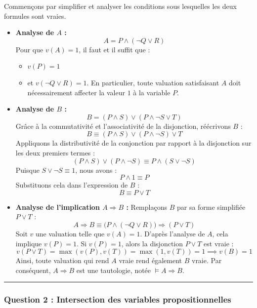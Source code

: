 \documentclass[11pt,a4paper]{article}
\begin{document}
Commençons par simplifier et analyser les conditions sous lesquelles les
deux formules sont vraies.

\begin{itemize}
\item
  \textbf{Analyse de \(A\) :} \[A = P \land (\neg Q \lor R)\] Pour que
  \(v(A) = 1\), il faut et il suffit que :

  \begin{itemize}
  \tightlist
  \item
    \(v(P) = 1\)
  \item
    et \(v(\neg Q \lor R) = 1\). En particulier, toute valuation
    satisfaisant \(A\) doit nécessairement affecter la valeur \(1\) à la
    variable \(P\).
  \end{itemize}
\item
  \textbf{Analyse de \(B\) :}
  \[B = (P \land S) \lor (P \land \neg S \lor T)\] Grâce à la
  commutativité et l'associativité de la disjonction, réécrivons \(B\) :
  \[B \equiv (P \land S) \lor (P \land \neg S) \lor T\] Appliquons la
  distributivité de la conjonction par rapport à la disjonction sur les
  deux premiers termes :
  \[(P \land S) \lor (P \land \neg S) \equiv P \land (S \lor \neg S)\]
  Puisque \(S \lor \neg S \equiv 1\), nous avons :
  \[P \land 1 \equiv P\] Substituons cela dans l'expression de \(B\) :
  \[B \equiv P \lor T\]
\item
  \textbf{Analyse de l'implication \(A \Rightarrow B\) :} Remplaçons
  \(B\) par sa forme simplifiée \(P \lor T\) :
  \[A \Rightarrow B \equiv \big( P \land (\neg Q \lor R) \big) \Rightarrow (P \lor T)\]
  Soit \(v\) une valuation telle que \(v(A) = 1\). D'après l'analyse de
  \(A\), cela implique \(v(P) = 1\). Si \(v(P) = 1\), alors la
  disjonction \(P \lor T\) est vraie :
  \[v(P \lor T) = \max(v(P), v(T)) = \max(1, v(T)) = 1 \implies v(B) = 1\]
  Ainsi, toute valuation qui rend \(A\) vraie rend également \(B\)
  vraie. Par conséquent, \(A \Rightarrow B\) est une tautologie, notée
  \(\models A \Rightarrow B\).
\end{itemize}

\begin{center}\rule{0.5\linewidth}{0.5pt}\end{center}

\hypertarget{question-2-intersection-des-variables-propositionnelles}{%
\subsubsection{Question 2 : Intersection des variables
propositionnelles}\label{question-2-intersection-des-variables-propositionnelles}}
\end{document}
